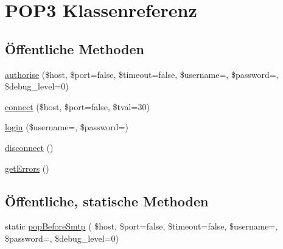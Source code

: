 \hypertarget{class_p_o_p3}{}\section{P\+O\+P3 Klassenreferenz}
\label{class_p_o_p3}
\subsection*{Öffentliche Methoden}
\begin{DoxyCompactItemize}
\item 
\mbox{\hyperlink{class_p_o_p3_ae80dba3738dd402631b4565259fff42e}{authorise}} (\$host, \$port=false, \$timeout=false, \$username=\textquotesingle{}\textquotesingle{}, \$password=\textquotesingle{}\textquotesingle{}, \$debug\+\_\+level=0)
\item 
\mbox{\hyperlink{class_p_o_p3_abeeb62ef3ea0ae1cc648112b4d870965}{connect}} (\$host, \$port=false, \$tval=30)
\item 
\mbox{\hyperlink{class_p_o_p3_a29a4c41512888f54b6940c695e5746c9}{login}} (\$username=\textquotesingle{}\textquotesingle{}, \$password=\textquotesingle{}\textquotesingle{})
\item 
\mbox{\hyperlink{class_p_o_p3_ab6dccba2275be90d856203b8cde81db4}{disconnect}} ()
\item 
\mbox{\hyperlink{class_p_o_p3_a83db44b1cc63a8ed5a309b9e56a9a4ec}{get\+Errors}} ()
\end{DoxyCompactItemize}
\subsection*{Öffentliche, statische Methoden}
\begin{DoxyCompactItemize}
\item 
static \mbox{\hyperlink{class_p_o_p3_a1fd138e5c3c70d1761c57e7551f6cce5}{pop\+Before\+Smtp}} ( \$host, \$port=false, \$timeout=false, \$username=\textquotesingle{}\textquotesingle{}, \$password=\textquotesingle{}\textquotesingle{}, \$debug\+\_\+level=0)
\end{DoxyCompactItemize}
